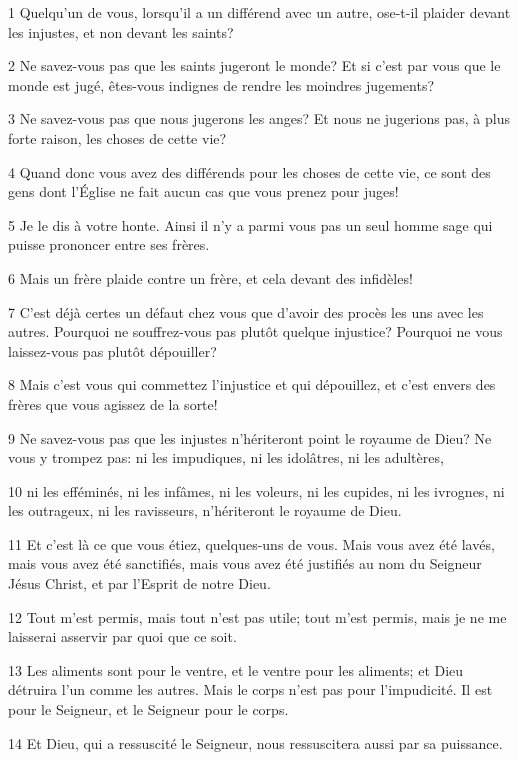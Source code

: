 \par 1 Quelqu'un de vous, lorsqu'il a un différend avec un autre, ose-t-il plaider devant les injustes, et non devant les saints?
\par 2 Ne savez-vous pas que les saints jugeront le monde? Et si c'est par vous que le monde est jugé, êtes-vous indignes de rendre les moindres jugements?
\par 3 Ne savez-vous pas que nous jugerons les anges? Et nous ne jugerions pas, à plus forte raison, les choses de cette vie?
\par 4 Quand donc vous avez des différends pour les choses de cette vie, ce sont des gens dont l'Église ne fait aucun cas que vous prenez pour juges!
\par 5 Je le dis à votre honte. Ainsi il n'y a parmi vous pas un seul homme sage qui puisse prononcer entre ses frères.
\par 6 Mais un frère plaide contre un frère, et cela devant des infidèles!
\par 7 C'est déjà certes un défaut chez vous que d'avoir des procès les uns avec les autres. Pourquoi ne souffrez-vous pas plutôt quelque injustice? Pourquoi ne vous laissez-vous pas plutôt dépouiller?
\par 8 Mais c'est vous qui commettez l'injustice et qui dépouillez, et c'est envers des frères que vous agissez de la sorte!
\par 9 Ne savez-vous pas que les injustes n'hériteront point le royaume de Dieu? Ne vous y trompez pas: ni les impudiques, ni les idolâtres, ni les adultères,
\par 10 ni les efféminés, ni les infâmes, ni les voleurs, ni les cupides, ni les ivrognes, ni les outrageux, ni les ravisseurs, n'hériteront le royaume de Dieu.
\par 11 Et c'est là ce que vous étiez, quelques-uns de vous. Mais vous avez été lavés, mais vous avez été sanctifiés, mais vous avez été justifiés au nom du Seigneur Jésus Christ, et par l'Esprit de notre Dieu.
\par 12 Tout m'est permis, mais tout n'est pas utile; tout m'est permis, mais je ne me laisserai asservir par quoi que ce soit.
\par 13 Les aliments sont pour le ventre, et le ventre pour les aliments; et Dieu détruira l'un comme les autres. Mais le corps n'est pas pour l'impudicité. Il est pour le Seigneur, et le Seigneur pour le corps.
\par 14 Et Dieu, qui a ressuscité le Seigneur, nous ressuscitera aussi par sa puissance.
